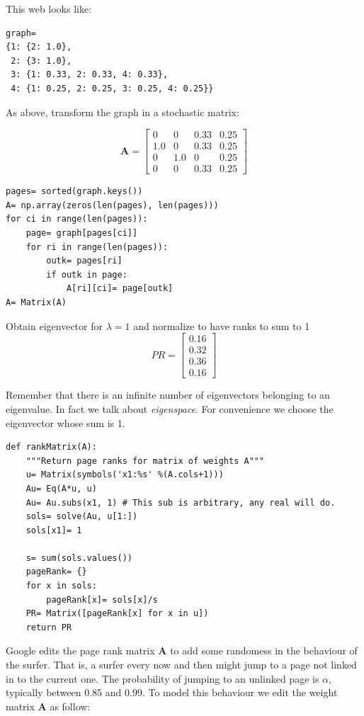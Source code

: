 This web looks like:

\begin{verbatim}
graph= 
{1: {2: 1.0},
 2: {3: 1.0},
 3: {1: 0.33, 2: 0.33, 4: 0.33},
 4: {1: 0.25, 2: 0.25, 3: 0.25, 4: 0.25}}
\end{verbatim}

As above, transform the graph in a stochastic matrix:

$$
\mathbf{A} = \left[\begin{matrix}0 & 0 & 0.33 & 0.25\\1.0 & 0 & 0.33 & 0.25\\0 & 1.0 & 0 & 0.25\\0 & 0 & 0.33 & 0.25\end{matrix}\right]
$$

\begin{verbatim}
pages= sorted(graph.keys())
A= np.array(zeros(len(pages), len(pages)))
for ci in range(len(pages)):
    page= graph[pages[ci]]
    for ri in range(len(pages)):
        outk= pages[ri]
        if outk in page:
            A[ri][ci]= page[outk]
A= Matrix(A)
\end{verbatim}

Obtain eigenvector for $\lambda= 1$ and normalize to have ranks to sum to 1
$$
PR = \left[\begin{matrix}0.16\\0.32\\0.36\\0.16\end{matrix}\right]
$$

Remember that there is an infinite number of eigenvectors belonging to an eigenvalue.
In fact we talk about \emph{eigenspace}. For convenience we choose the eigenvector
whose sum is 1.

\begin{verbatim}
def rankMatrix(A):
    """Return page ranks for matrix of weights A"""
    u= Matrix(symbols('x1:%s' %(A.cols+1)))
    Au= Eq(A*u, u)
    Au= Au.subs(x1, 1) # This sub is arbitrary, any real will do.
    sols= solve(Au, u[1:])
    sols[x1]= 1
    
    s= sum(sols.values())
    pageRank= {}
    for x in sols:
        pageRank[x]= sols[x]/s
    PR= Matrix([pageRank[x] for x in u])
    return PR
\end{verbatim}

Google edits the page rank matrix \textbf{A} to add some randomess in the behaviour
of the surfer. That is, a surfer every now and then might jump to a page not linked
in to the current one. The probability of jumping to an unlinked page is $\alpha$,
typically between 0.85 and 0.99.
To model this behaviour we edit the weight matrix \textbf{A} as follow:

